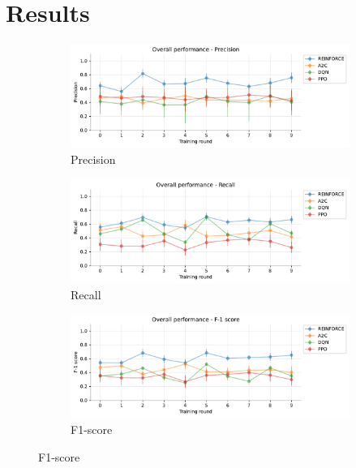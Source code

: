 \documentclass[a4paper, 12pt]{article}
\begin{document}
\section{Results}\label{sec:Results}

\begin{figure}[ht]
	\begin{subfigure}{\textwidth}
	\centering
	\includegraphics[width=\linewidth]{Overall_Pr.pdf}  
	\caption{Precision}
	\label{fig:tr-ovr-pr}
	\end{subfigure} \par\smallskip

	\begin{subfigure}{\textwidth}
	\centering
	\includegraphics[width=\linewidth]{Overall_Rc.pdf}  
	\caption{Recall}
	\label{fig:tr-ovr-rc}
	\end{subfigure} \par\smallskip
	
	\begin{subfigure}{\textwidth}
		\centering
		\includegraphics[width=\linewidth]{Overall_F1.pdf}  
		\caption{F1-score}
		\label{fig:tr-ovr-f1}
	\end{subfigure} \par\smallskip


\end{figure}
\end{document}
